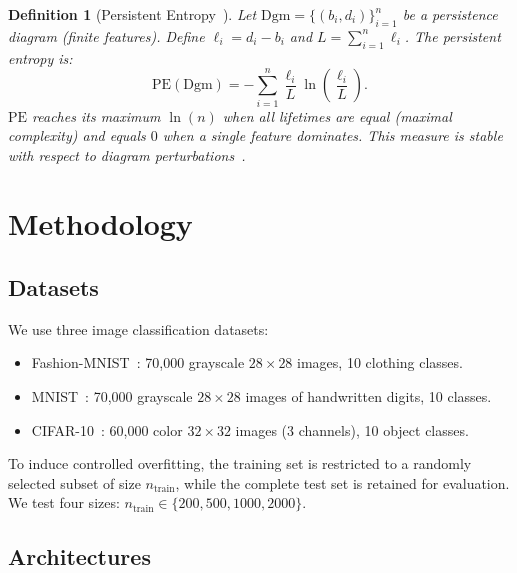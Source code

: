 \documentclass[11pt,a4paper]{article}
\newtheorem{definition}{Definition}[section]
\newcommand{\PE}{\mathrm{PE}}
\newcommand{\Dgm}{\mathrm{Dgm}}
\begin{document}
\begin{definition}[Persistent Entropy~\cite{Atienza_2020}]
\label{def:pe}
Let $\Dgm = \{(b_i, d_i)\}_{i=1}^{n}$ be a persistence diagram (finite
features). Define $\ell_i = d_i - b_i$ and $L = \sum_{i=1}^{n} \ell_i$.
The persistent entropy is:
\begin{equation}
  \PE(\Dgm) = - \sum_{i=1}^{n} \frac{\ell_i}{L} \ln
  \left(\frac{\ell_i}{L}\right).
  \label{eq:pe}
\end{equation}
$\PE$ reaches its maximum $\ln(n)$ when all lifetimes are equal (maximal
complexity) and equals $0$ when a single feature dominates. This measure
is stable with respect to diagram perturbations~\cite{Atienza_2020}.
\end{definition}

\section{Methodology}
\label{sec:methode}

\subsection{Datasets}
\label{subsec:donnees}

We use three image classification datasets:
\begin{itemize}
  \item Fashion-MNIST~\cite{xiao2017fashionmnistnovelimagedataset}: 70,000 grayscale
  $28 \times 28$ images, 10 clothing classes.
  \item MNIST~\cite{lecun1998gradient}: 70,000 grayscale $28 \times 28$ images of
  handwritten digits, 10 classes.
  \item CIFAR-10~\cite{Krizhevsky2009LearningML}: 60,000 color
  $32 \times 32$ images (3 channels), 10 object classes.
\end{itemize}

To induce controlled overfitting, the training set is restricted to a
randomly selected subset of size $n_{\mathrm{train}}$, while the complete
test set is retained for evaluation. We test four sizes:
$n_{\mathrm{train}} \in \{200, 500, 1000, 2000\}$.

\subsection{Architectures}
\label{subsec:architectures}
\end{document}
